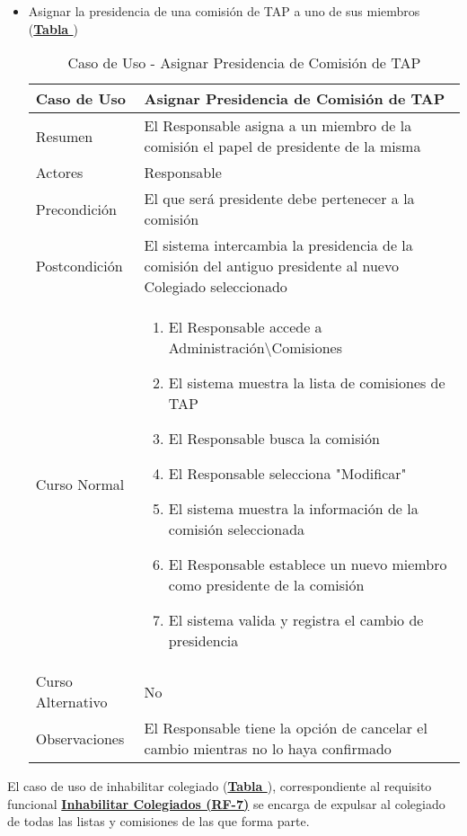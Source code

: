 \begin{itemize}
	\item \addtocounter{tabla}{1} Asignar la presidencia de una comisión de TAP a uno de sus miembros (\textbf{\hyperref[tab:curAsignarPresidenciaComisionTAP]{Tabla }})
		\begin{table}[!htbp]
		  \centering \addtocounter{casouso}{1}
		  \begin{tabular}{|l | p{100mm}|}
		    \textbf{Caso de Uso}  & \textbf{Asignar Presidencia de Comisión de TAP} \\ \hline
		    Resumen 		 & El Responsable asigna a un miembro de la comisión el papel de presidente de la misma \\ \hline
		    Actores  		 & Responsable \\ \hline
		    Precondición  	 & El que será presidente debe pertenecer a la comisión \\ \hline
		    Postcondición  	 & El sistema intercambia la presidencia de la comisión del antiguo presidente al nuevo Colegiado seleccionado \\ \hline
		    Curso Normal   	 & \begin{enumerate}
			  \item El Responsable accede a Administración\textbackslash Comisiones
			  \item El sistema muestra la lista de comisiones de TAP
			  \item El Responsable busca la comisión
			  \item El Responsable selecciona "Modificar"
			  \item El sistema muestra la información de la comisión seleccionada
			  \item El Responsable establece un nuevo miembro como presidente de la comisión
			  \item El sistema valida y registra el cambio de presidencia
		    \end{enumerate}  \\ \hline
		    Curso Alternativo  & No  \\ \hline
		    Observaciones 	 & El Responsable tiene la opción de cancelar el cambio mientras no lo haya confirmado  \\ \hline
		  \end{tabular}
		  \caption{Caso de Uso  - Asignar Presidencia de Comisión de TAP}
		  \label{tab:curAsignarPresidenciaComisionTAP}
		\end{table}
		\FloatBarrier
\end{itemize}

\addtocounter{tabla}{1}
El caso de uso de inhabilitar colegiado (\textbf{\hyperref[tab:curInhabilitar]{Tabla }}), correspondiente al requisito funcional \textbf{\hyperref[tab:rfInhabilitar]{Inhabilitar Colegiados (RF-7)}} se encarga de expulsar al colegiado de todas las listas y comisiones de las que forma parte.

